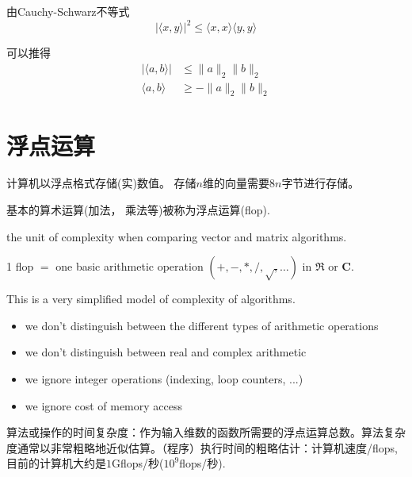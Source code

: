 \begin{corollary}
    由Cauchy-Schwarz不等式
    \begin{equation}
    |\langle x, y\rangle|^{2} \leq\langle x, x\rangle\langle y, y\rangle
    \end{equation}

    可以推得
    \begin{equation}\begin{aligned}
        |\langle a,b \rangle| &\le \| a \|_2 \| b \|_2\\
        \langle a,b \rangle &\ge -\| a \|_2 \| b \|_2
    \end{aligned} \end{equation}
\end{corollary}


\section{浮点运算}

计算机以浮点格式存储(实)数值。 存储$n$维的向量需要$8n$字节进行存储。

基本的算术运算(加法， 乘法等)被称为浮点运算(flop). 

\begin{definition}
    the unit of complexity when comparing vector and matrix algorithms.

    1 flop $ = $ one basic arithmetic operation $ (+,-, *, /, \sqrt{,} \ldots) $ in $ \mathfrak{R} $ or $ \mathbf{C} $.
\end{definition}

\begin{remark}
    This is a very simplified model of complexity of algorithms.

    \begin{itemize}
        \item we don't distinguish between the different types of arithmetic operations
        \item we don't distinguish between real and complex arithmetic
        \item we ignore integer operations (indexing, loop counters, ...)
        \item we ignore cost of memory access
    \end{itemize}
\end{remark}

算法或操作的时间复杂度：作为输入维数的函数所需要的浮点运算总数。算法复杂度通常以非常粗略地近似估算。（程序）执行时间的粗略估计：计算机速度/flops,目前的计算机大约是$1$Gflops/秒($10^9$flops/秒).

